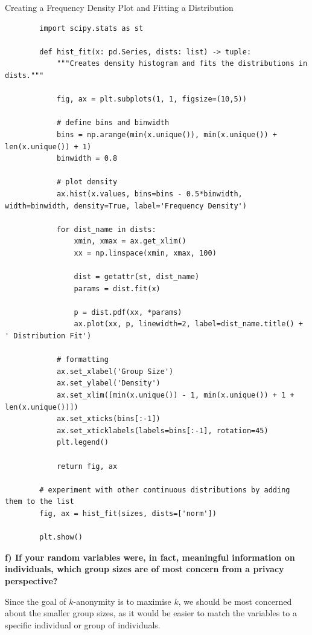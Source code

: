 \documentclass{article}
\begin{document}
\begin{mybox}[colbacktitle=green]{Creating a Frequency Density Plot and Fitting a Distribution}
    \begin{verbatim}
        import scipy.stats as st

        def hist_fit(x: pd.Series, dists: list) -> tuple:
            """Creates density histogram and fits the distributions in dists.""" 

            fig, ax = plt.subplots(1, 1, figsize=(10,5))

            # define bins and binwidth
            bins = np.arange(min(x.unique()), min(x.unique()) + len(x.unique()) + 1)
            binwidth = 0.8

            # plot density
            ax.hist(x.values, bins=bins - 0.5*binwidth, width=binwidth, density=True, label='Frequency Density')

            for dist_name in dists:
                xmin, xmax = ax.get_xlim()
                xx = np.linspace(xmin, xmax, 100)

                dist = getattr(st, dist_name)
                params = dist.fit(x)

                p = dist.pdf(xx, *params)
                ax.plot(xx, p, linewidth=2, label=dist_name.title() + ' Distribution Fit')

            # formatting
            ax.set_xlabel('Group Size')
            ax.set_ylabel('Density')
            ax.set_xlim([min(x.unique()) - 1, min(x.unique()) + 1 + len(x.unique())])
            ax.set_xticks(bins[:-1])
            ax.set_xticklabels(labels=bins[:-1], rotation=45)
            plt.legend()

            return fig, ax

        # experiment with other continuous distributions by adding them to the list
        fig, ax = hist_fit(sizes, dists=['norm'])

        plt.show()
    \end{verbatim}
\end{mybox}

\newpage 

\textbf{f) If your random variables were, in fact, meaningful information on individuals, which group sizes are of most concern from a privacy perspective?} 

\vspace{\baselineskip}

Since the goal of $k$-anonymity is to maximise $k$, we should be most concerned about the smaller group sizes, as it would be easier to match the variables to a specific individual or group of individuals. 
\end{document}
